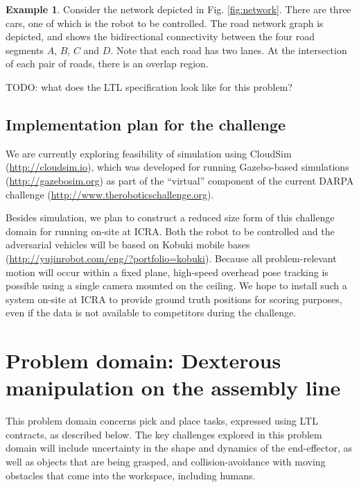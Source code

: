 \documentclass{amsart}
\theoremstyle{definition}
\newtheorem{example}{Example}[section]
\begin{document}
\begin{example}
Consider the network depicted in Fig. \ref{fig:network}. There are three cars,
one of which is the robot to be controlled. The road network graph is depicted,
and shows the bidirectional connectivity between the four road segments $A$,
$B$, $C$ and $D$. Note that each road has two lanes. At the intersection of each
pair of roads, there is an overlap region.
\end{example}

TODO: what does the LTL specification look like for this problem?

\subsection{Implementation plan for the challenge}

We are currently exploring feasibility of simulation using CloudSim
(\url{http://cloudsim.io}), which was developed for running Gazebo-based
simulations (\url{http://gazebosim.org}) as part of the ``virtual'' component of
the current DARPA challenge (\url{http://www.theroboticschallenge.org}).

Besides simulation, we plan to construct a reduced size form of this challenge
domain for running on-site at ICRA.  Both the robot to be controlled and the
adversarial vehicles will be based on Kobuki mobile bases
(\url{http://yujinrobot.com/eng/?portfolio=kobuki}).  Because all
problem-relevant motion will occur within a fixed plane, high-speed overhead
pose tracking is possible using a single camera mounted on the ceiling.  We hope
to install such a system on-site at ICRA to provide ground truth positions for
scoring purposes, even if the data is not available to competitors during the
challenge.

\section{Problem domain: Dexterous manipulation on the assembly line}\label{sec:dexterousmanip}

This problem domain concerns pick and place tasks, expressed using LTL
contracts, as described below. The key challenges explored in this problem
domain will include uncertainty in the shape and dynamics of the end-effector,
as well as objects that are being grasped, and collision-avoidance with moving
obstacles that come into the workspace, including humans.
\end{document}
